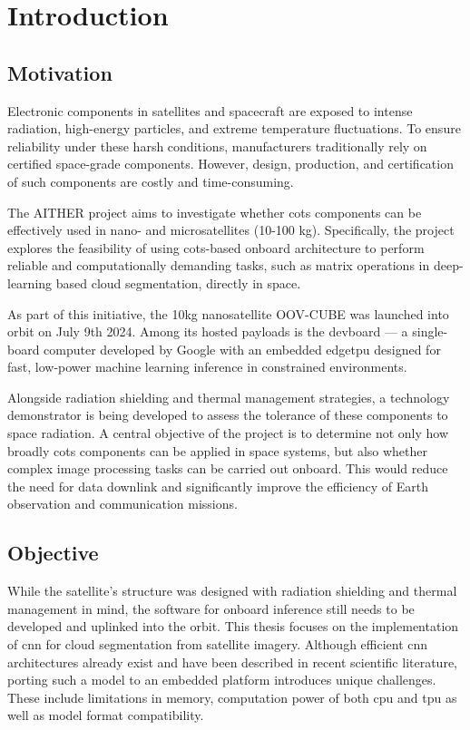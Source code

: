 {

\setlength{\parindent}{0pt}
\setlength{\parskip}{1em}

\chapter{Introduction}
\section{Motivation}

Electronic components in satellites and spacecraft are exposed to intense radiation, high-energy particles, and extreme temperature fluctuations.
To ensure reliability under these harsh conditions, manufacturers traditionally rely on certified space-grade components.
However, design, production, and certification of such components are costly and time\--con\-su\-ming. 

The AITHER project aims to investigate whether \gls{cots} components can be effectively used in nano- and microsatellites (10-100 kg).
Specifically, the project explores the feasibility of using \gls{cots}-based onboard architecture to perform reliable and computationally demanding tasks,
such as matrix operations in deep-learning based cloud segmentation, directly in space. 

As part of this initiative, the 10kg nanosatellite OOV-CUBE was launched into orbit on July 9th 2024.
Among its hosted payloads is the \gls{devboard} --- a single-board computer developed by Google with an embedded \gls{edgetpu} designed for fast,
low-power machine learning inference in constrained environments.

Alongside radiation shielding and thermal management strategies,
a technology demonstrator is being developed to assess the tolerance of these components to space radiation.
A central objective of the project is to determine not only how broadly \gls{cots} components can be applied in space systems,
but also whether complex image processing tasks can be carried out onboard.
This would reduce the need for data downlink and significantly improve the efficiency of Earth observation and communication missions.

\clearpage
\section{Objective}

While the satellite's structure was designed with radiation shielding and thermal management in mind,
the software for onboard inference still needs to be developed and uplinked into the orbit.
This thesis focuses on the implementation of \gls{cnn} for cloud segmentation from satellite imagery.
Although efficient \gls{cnn} architectures already exist and have been described in recent scientific literature,
porting such a model to an embedded platform introduces unique challenges. These include limitations in memory,
computation power of both \gls{cpu} and \gls{tpu} as well as model format compatibility.

}

